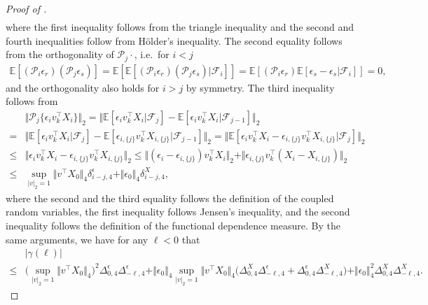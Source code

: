 \documentclass[11pt]{article}
\theoremstyle{plain}
\theoremstyle{definition}
\begin{document}
\begin{proof}[Proof of ]
\begin{align*}
\end{align*}
    where the first inequality follows from the triangle inequality and the second and fourth inequalities follow from H\"older's inequality. The second equality follows from the orthogonality of $\mathcal{P}_j\cdot$, i.e.~for $i < j$
    \begin{align*}
        \mathbb{E}[(\mathcal{P}_i\epsilon_r)(\mathcal{P}_j\epsilon_s)] = \mathbb{E}[\mathbb{E}[(\mathcal{P}_i\epsilon_r)(\mathcal{P}_j\epsilon_s)|\mathcal{F}_{i}]] = \mathbb{E}[(\mathcal{P}_i\epsilon_r)\mathbb{E}[\epsilon_s-\epsilon_s|\mathcal{F}_i]] = 0,
    \end{align*}
    and the orthogonality also holds for $i > j$ by symmetry. The third inequality follows from
    \begin{align*}
       &\Vert \mathcal{P}_{j}\{\epsilon_iv_k^{\top}X_{i}\} \Vert_2 = \Vert \mathbb{E}[\epsilon_iv_k^{\top}X_{i}| \mathcal{F}_{j}] - \mathbb{E}[\epsilon_iv_k^{\top}X_{i}| \mathcal{F}_{j-1}]\Vert_2\\
       =& \Vert\mathbb{E}[\epsilon_iv_k^{\top}X_{i}| \mathcal{F}_{j}] - \mathbb{E}[\epsilon_{i,\{j\}}v_k^{\top}X_{i,\{j\}}| \mathcal{F}_{j-1}]\Vert_2 = \Vert\mathbb{E}[\epsilon_iv_k^{\top}X_{i}-\epsilon_{i,\{j\}}v_k^{\top}X_{i,\{j\}}| \mathcal{F}_{j}]\Vert_2\\
       \leq& \Vert \epsilon_iv_k^{\top}X_{i}-\epsilon_{i,\{j\}}v_k^{\top}X_{i,\{j\}}\Vert_2 \leq \Vert (\epsilon_i - \epsilon_{i,\{j\}})v_k^{\top}X_{i}\Vert_2 + \Vert \epsilon_{i,\{j\}}v_k^{\top}(X_{i} - X_{i,\{j\}})\Vert_2\\
       \leq& \sup_{|v|_2 = 1}\big\Vert v^{\top} X_0 \big\Vert_4\delta^{\epsilon}_{i-j,4} + \Vert \epsilon_0 \Vert_4\delta^{X}_{i-j,4},
    \end{align*}
    where the second and the third equality follows the definition of the coupled random variables, the first inequality follows Jensen's inequality, and the second inequality follows the definition of the functional dependence measure. By the same arguments, we have for any $\ell < 0$ that
    \begin{align*}
    &|\gamma(\ell)|\\
    \leq& \Big(\sup_{|v|_2 = 1}\big\Vert v^{\top} X_0 \big\Vert_4\Big)^2\Delta^{\epsilon}_{0,4}\Delta^{\epsilon}_{-\ell,4} + \Vert \epsilon_0 \Vert_4\sup_{|v|_2 = 1}\big\Vert v^{\top} X_0 \big\Vert_4\big(\Delta^{X}_{0,4}\Delta^{\epsilon}_{-\ell,4} + \Delta^{\epsilon}_{0,4}\Delta^{X}_{-\ell,4}\big) + \Vert \epsilon_0 \Vert_4^2\Delta^{X}_{0,4}\Delta^{X}_{-\ell,4}.
    \end{align*}

\end{proof}
\end{document}
